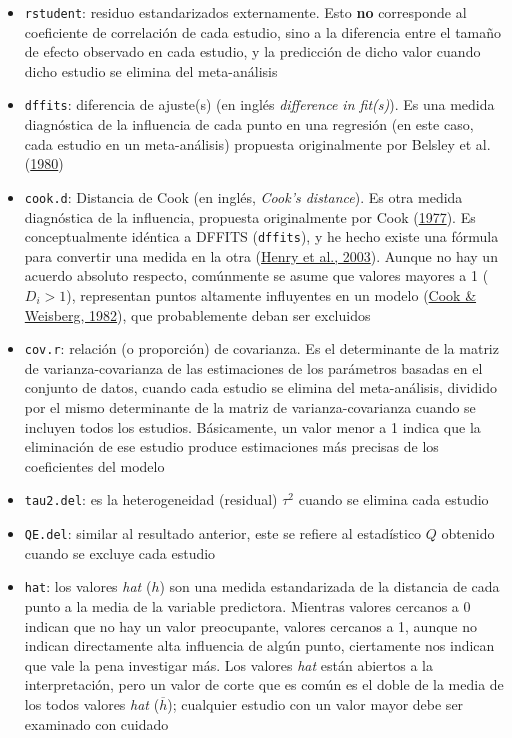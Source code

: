 \documentclass[
  bookmarksnumbered]{article}
\begin{document}
\begin{itemize}
\item
  \texttt{rstudent}: residuo estandarizados externamente. Esto \textbf{no} corresponde al coeficiente de correlación de cada estudio, sino a la diferencia entre el tamaño de efecto observado en cada estudio, y la predicción de dicho valor cuando dicho estudio se elimina del meta-análisis
\item
  \texttt{dffits}: diferencia de ajuste(s) (en inglés \emph{difference in fit(s)}). Es una medida diagnóstica de la influencia de cada punto en una regresión (en este caso, cada estudio en un meta-análisis) propuesta originalmente por Belsley et al. (\protect\hyperlink{ref-belsleyRegressionDiagnosticsIdentifying1980}{1980})
\item
  \texttt{cook.d}: Distancia de Cook (en inglés, \emph{Cook's distance}). Es otra medida diagnóstica de la influencia, propuesta originalmente por Cook (\protect\hyperlink{ref-cookDetectionInfluentialObservation1977}{1977}). Es conceptualmente idéntica a DFFITS (\texttt{dffits}), y he hecho existe una fórmula para convertir una medida en la otra (\protect\hyperlink{ref-Henry2003}{Henry et al., 2003}). Aunque no hay un acuerdo absoluto respecto, comúnmente se asume que valores mayores a 1 (\(D_{i} > 1\)), representan puntos altamente influyentes en un modelo (\protect\hyperlink{ref-cookResidualsInfluenceRegression1982}{Cook \& Weisberg, 1982}), que probablemente deban ser excluidos
\item
  \texttt{cov.r}: relación (o proporción) de covarianza. Es el determinante de la matriz de varianza-covarianza de las estimaciones de los parámetros basadas en el conjunto de datos, cuando cada estudio se elimina del meta-análisis, dividido por el mismo determinante de la matriz de varianza-covarianza cuando se incluyen todos los estudios. Básicamente, un valor menor a 1 indica que la eliminación de ese estudio produce estimaciones más precisas de los coeficientes del modelo
\item
  \texttt{tau2.del}: es la heterogeneidad (residual) \(\tau^2\) cuando se elimina cada estudio
\item
  \texttt{QE.del}: similar al resultado anterior, este se refiere al estadístico \(Q\) obtenido cuando se excluye cada estudio
\item
  \texttt{hat}: los valores \emph{hat} (\(h\)) son una medida estandarizada de la distancia de cada punto a la media de la variable predictora. Mientras valores cercanos a 0 indican que no hay un valor preocupante, valores cercanos a 1, aunque no indican directamente alta influencia de algún punto, ciertamente nos indican que vale la pena investigar más. Los valores \emph{hat} están abiertos a la interpretación, pero un valor de corte que es común es el doble de la media de los todos valores \emph{hat} (\(\overline{h}\)); cualquier estudio con un valor mayor debe ser examinado con cuidado

\end{itemize}
\end{document}
